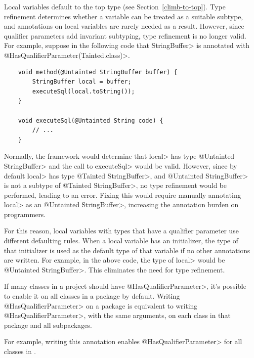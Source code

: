
Local variables default to the top type (see
Section~\ref{climb-to-top}). Type refinement determines whether a variable can be
treated as a suitable subtype, and annotations on local variables are rarely
needed as a result. However, since qualifier parameters add invariant subtyping,
type refinement is no longer valid. For example, suppose in the following code
that \<StringBuffer> is annotated with \<@HasQualifierParameter(Tainted.class)>.

\begin{Verbatim}
    void method(@Untainted StringBuffer buffer) {
        StringBuffer local = buffer;
        executeSql(local.toString());
    }

    void executeSql(@Untainted String code) {
        // ...
    }
\end{Verbatim}

Normally, the framework would determine that \<local> has type \<@Untainted
StringBuffer> and the call to \<executeSql> would be valid. However, since by
default \<local> has type \<@Tainted StringBuffer>, and
\<@Untainted StringBuffer> is not a subtype of \<@Tainted StringBuffer>, no type
refinement would be performed, leading to an error. Fixing this would require
manually annotating \<local> as an \<@Untainted StringBuffer>, increasing the
annotation burden on programmers.

For this reason, local variables with types that have a qualifier parameter use
different defaulting rules. When a local variable has an initializer, the type
of that initializer is used as the default type of that variable if no other
annotations are written. For example, in the above code, the type of \<local>
would be \<@Untainted StringBuffer>. This eliminates the need for type
refinement.


If many classes in a project should have \<@HasQualifierParameter>, it's
possible to enable it on all classes in a package by default. Writing
\<@HasQualifierParameter> on a package is equivalent to writing
\<@HasQualifierParameter>, with the same arguments, on each class in that package
and all subpackages.

For example, writing this annotation enables \<@HasQualifierParameter>
for all classes in .

